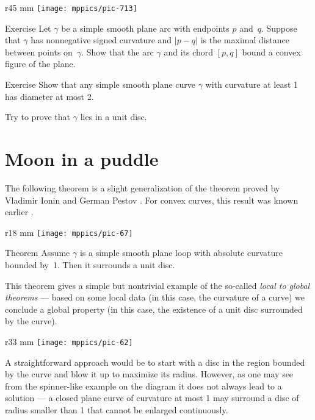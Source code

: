 \begin{wrapfigure}{r}{45 mm}
\vskip-0mm
\centering
\texttt{[image: mppics/pic-713]}
\vskip0mm
\end{wrapfigure}

\begin{thm}{Exercise}\label{ex:convex-lens}
Let $\gamma$ be a simple smooth plane arc with endpoints $p$ and~$q$.
Suppose that $\gamma$ has nonnegative signed curvature and $|p-q|$ is the maximal distance between points on~$\gamma$.
Show that the arc $\gamma$ and its chord $[p,q]$ bound a convex figure of the plane.
\end{thm}

\begin{thm}{Exercise}\label{ex:diameter-of-simple-curve}
Show that any simple smooth plane curve $\gamma$ with curvature at least 1 has diameter at most 2.

Try to prove that $\gamma$ lies in a unit disc.
\end{thm}


\section{Moon in a puddle}

The following theorem is a slight generalization of the theorem proved by Vladimir Ionin and German Pestov \cite{ionin-pestov}.
For convex curves, this result was known earlier \cite[\S 24]{blaschke}.


\begin{wrapfigure}{r}{18 mm}
\vskip-8mm
\centering
\texttt{[image: mppics/pic-67]}
\vskip-2mm
\end{wrapfigure}

\begin{thm}{Theorem}\label{thm:moon-orginal}
Assume $\gamma$ is a simple smooth plane loop with absolute curvature bounded by~1.
Then it surrounds a unit disc.
\end{thm}

This theorem gives a simple but nontrivial example of the so-called \emph{local to global theorems} --- based on some local data (in this case, the curvature of a curve) we conclude a global property (in this case, the existence of a unit disc surrounded by the curve).

{

\begin{wrapfigure}{r}{33 mm}
\vskip-4mm
\centering
\texttt{[image: mppics/pic-62]}
\vskip0mm
\end{wrapfigure}

A straightforward approach would be to start with a disc in the region bounded by the curve and blow it up to maximize its radius.
However, as one may see from the spinner-like example on the diagram it does not always lead to a solution --- a closed plane curve of curvature at most 1 may surround a disc of radius smaller than 1 that cannot be enlarged continuously.

}

